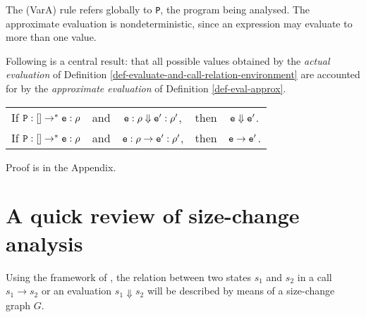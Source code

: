 \documentclass{LMCS}
\newcommand{\fl}{\noindent}
\newcommand{\bt}{\begin{tabular}}
\newcommand{\et}{\end{tabular}}
\newcommand{\blem}{\begin{lem}}
\newcommand{\elem}{\end{lem}}
\theoremstyle{definition}\newtheorem{env}[thm]{Environment}
\begin{document}
\fl  The (VarA) rule refers globally to {\tt P}, the program being 
analysed.
The approximate evaluation is nondeterministic, since an 
expression may evaluate to more than one value. 
\medskip

Following is a central result: that 
all possible values obtained by the {\em actual evaluation} of  Definition \ref{def-evaluate-and-call-relation-environment}
are accounted for by
the {\em approximate evaluation} of Definition \ref{def-eval-approx}.
\blem \label{abs-super} 
\hfill  \bt{ccccc} If ${\tt P}:[]\to^*{\tt e}:\rho$ &and& ${\tt e}:\rho\Downarrow{\tt e}':\rho'$, &then& 
${\tt e}\Downarrow{\tt e}'$. \\

\hfill  If  ${\tt P}:[]\to^*{\tt e}:\rho$  &and& ${\tt e}:\rho\to{\tt e}':\rho'$, &then& ${\tt e}\to{\tt e}'$.
\et
\elem
\fl Proof is in the Appendix.
\section{A quick review of size-change analysis}
 \label{sec-quick-review-size-change-analysis}


Using the framework of  \cite{popl01}, the relation between two
states $s_1$ and $s_2$ in a call 
$s_1\to s_2$ or an evaluation $s_1\Downarrow s_2$ will be
described by means of a size-change graph $G$. 
\end{document}
